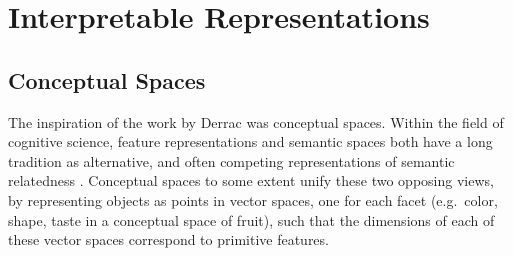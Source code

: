 







\section{Interpretable Representations}\label{ch2:interpretability}

\subsection{Conceptual Spaces}

The inspiration of the work by Derrac \cite{Derrac2015} was conceptual spaces. Within the field of cognitive science, feature representations and semantic spaces both have a long tradition as alternative, and often competing representations of semantic relatedness \cite{tversky1977features}. Conceptual spaces \cite{gardenfors2004conceptual} to some extent unify these two opposing views, by representing objects as points in vector spaces, one for each facet (e.g.\ color, shape, taste in a conceptual space of fruit), such that the dimensions of each of these vector spaces correspond to primitive features. %

